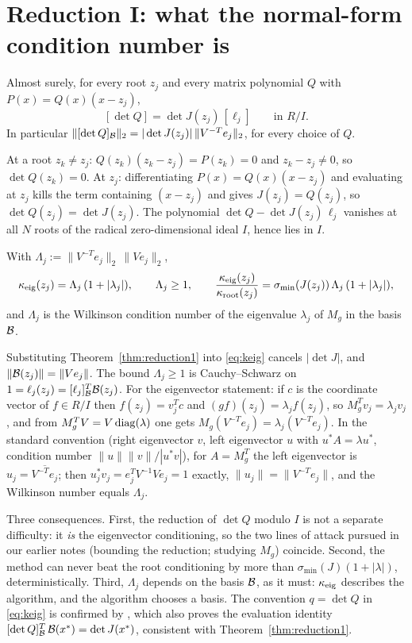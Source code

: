 \section{Reduction I: what the normal-form condition number is}\label{sec:reduction1}

\begin{theorem}\label{thm:reduction1}
  Almost surely, for every root $z_j$ and every matrix polynomial $Q$ with
  $P(x)=Q(x)(x-z_j)$,
  \[
    [\det Q] = \det J(z_j)\,[\ell_j] \qquad \text{in } R/I.
  \]
  In particular $\|[\det Q]_{\mathcal{B}}\|_2 = |\det J(z_j)|\,\|V^{-T}e_j\|_2$, for every choice of $Q$.
\end{theorem}

\proof
At a root $z_k\ne z_j$: $Q(z_k)(z_k-z_j) = P(z_k) = 0$ and $z_k-z_j\ne0$, so
$\det Q(z_k)=0$. At $z_j$: differentiating $P(x)=Q(x)(x-z_j)$ and evaluating at $z_j$ kills
the term containing $(x-z_j)$ and gives $J(z_j)=Q(z_j)$, so $\det Q(z_j)=\det J(z_j)$. The
polynomial $\det Q - \det J(z_j)\,\ell_j$ vanishes at all $N$ roots of the radical
zero-dimensional ideal $I$, hence lies in $I$.
\endproof

\begin{corollary}\label{cor:wilkinson}
  With $\Lambda_j := \|V^{-T}e_j\|_2\,\|Ve_j\|_2$,
  \[
    \kappa_{\mathrm{eig}}(z_j) = \Lambda_j\,(1+|\lambda_j|), \qquad \Lambda_j\ge1, \qquad
    \frac{\kappa_{\mathrm{eig}}(z_j)}{\kappa_{\mathrm{root}}(z_j)} = \sigma_{\min}(J(z_j))\,\Lambda_j\,(1+|\lambda_j|),
  \]
  and $\Lambda_j$ is the Wilkinson condition number of the eigenvalue $\lambda_j$ of $M_g$ in
  the basis $\mathcal{B}$.
\end{corollary}

\proof
Substituting Theorem~\ref{thm:reduction1} into \eqref{eq:keig} cancels $|\det J|$, and
$\|\mathcal{B}(z_j)\| = \|Ve_j\|$. The bound $\Lambda_j\ge1$ is Cauchy--Schwarz on
$1 = \ell_j(z_j) = [\ell_j]_{\mathcal{B}}^T \mathcal{B}(z_j)$. For the eigenvector statement: if $c$ is the
coordinate vector of $f\in R/I$ then $f(z_j) = v_j^Tc$ and $(gf)(z_j) = \lambda_j f(z_j)$, so
$M_g^Tv_j = \lambda_jv_j$, and from $M_g^TV = V\operatorname{diag}(\lambda)$ one gets
$M_g(V^{-T}e_j) = \lambda_j(V^{-T}e_j)$. In the standard convention (right eigenvector $v$,
left eigenvector $u$ with $u^*A = \lambda u^*$, condition number $\|u\|\|v\|/|u^*v|$), for
$A = M_g^T$ the left eigenvector is $u_j = \overline{V^{-T}e_j}$; then
$u_j^*v_j = e_j^TV^{-1}Ve_j = 1$ exactly, $\|u_j\| = \|V^{-T}e_j\|$, and the Wilkinson number
equals $\Lambda_j$.
\endproof

\begin{remark}\label{rem:reduction1}
  Three consequences. First, the reduction of $\det Q$ modulo $I$ is not a separate
  difficulty: it \emph{is} the eigenvector conditioning, so the two lines of attack pursued in
  our earlier notes (bounding the reduction; studying $M_g$) coincide. Second, the method can
  never beat the root conditioning by more than $\sigma_{\min}(J)(1+|\lambda|)$,
  deterministically. Third, $\Lambda_j$ depends on the basis $\mathcal{B}$, as it must: $\kappa_{\mathrm{eig}}$
  describes the algorithm, and the algorithm chooses a basis. The convention $q=\det Q$ in
  \eqref{eq:keig} is confirmed by \cite[Thm.~6.2]{graf2026numerical}, which also proves the
  evaluation identity $[\det Q]_{\mathcal{B}}^T\,\mathcal{B}(x^*) = \det J(x^*)$, consistent with
  Theorem~\ref{thm:reduction1}.
\end{remark}
